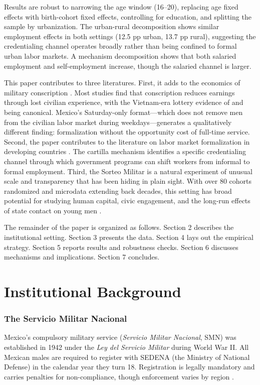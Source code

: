 \documentclass[12pt]{article}
\begin{document}
Results are robust to narrowing the age window (16--20), replacing age fixed effects with birth-cohort fixed effects, controlling for education, and splitting the sample by urbanization. The urban-rural decomposition shows similar employment effects in both settings (12.5 pp urban, 13.7 pp rural), suggesting the credentialing channel operates broadly rather than being confined to formal urban labor markets. A mechanism decomposition shows that both salaried employment and self-employment increase, though the salaried channel is larger.

This paper contributes to three literatures. First, it adds to the economics of military conscription \citep{angrist1990, angristchen2011, card2011, galiani2011, bedegral2014, bauer2012}. Most studies find that conscription reduces earnings through lost civilian experience, with the Vietnam-era lottery evidence of \citet{angrist1990} and \citet{angristchen2011} being canonical. Mexico's Saturday-only format---which does not remove men from the civilian labor market during weekdays---generates a qualitatively different finding: formalization without the opportunity cost of full-time service. Second, the paper contributes to the literature on labor market formalization in developing countries \citep{levy2008, laeven2014, ulyssea2018}. The cartilla mechanism identifies a specific credentialing channel through which government programs can shift workers from informal to formal employment. Third, the Sorteo Militar is a natural experiment of unusual scale and transparency that has been hiding in plain sight. With over 80 cohorts randomized and microdata extending back decades, this setting has broad potential for studying human capital, civic engagement, and the long-run effects of state contact on young men \citep{decarvalho2006}.

The remainder of the paper is organized as follows. Section 2 describes the institutional setting. Section 3 presents the data. Section 4 lays out the empirical strategy. Section 5 reports results and robustness checks. Section 6 discusses mechanisms and implications. Section 7 concludes.


\section{Institutional Background}

\subsubsection*{The Servicio Militar Nacional} Mexico's compulsory military service (\textit{Servicio Militar Nacional}, SMN) was established in 1942 under the \textit{Ley del Servicio Militar} during World War II. All Mexican males are required to register with SEDENA (the Ministry of National Defense) in the calendar year they turn 18. Registration is legally mandatory and carries penalties for non-compliance, though enforcement varies by region \citep{sedena2024}.
\end{document}
